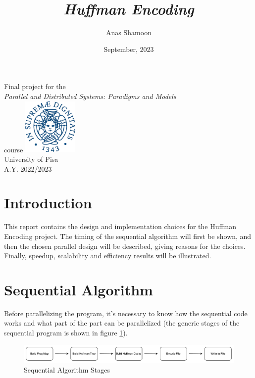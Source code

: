 \documentclass[12pt, letterpaper]{article}  %
\title{\textit{Huffman Encoding}}
\author{Anas Shamoon}
\date{September, 2023}
\begin{document}
\begin{titlepage}
	\maketitle
   \begin{center}
	\vspace{0.5cm}
       Final project for the\\ \textit{Parallel and Distributed Systems: Paradigms and Models}\\ course
       \vfill	     
       \includegraphics[width=0.2\textwidth]{Images/unipi.png}\\
       University of Pisa\\
       A.Y. 2022/2023\\
   \end{center}
\end{titlepage}
\newpage

\setcounter{tocdepth}{7}
\setcounter{secnumdepth}{4}

\maketitle

\begin{center}
\hspace{0.5cm}
{\footnotesize \tableofcontents}
\end{center}


\newpage

\section{Introduction}
This report contains the design and implementation choices for the Huffman Encoding project. The timing of the sequential algorithm will first be shown, and then the chosen parallel design will be described, giving reasons for the choices. Finally, speedup, scalability and efficiency results will be illustrated. 
\section{Sequential Algorithm}
Before parallelizing the program, it's necessary to know how the sequential code works and what part of the part can be parallelized (the generic stages of the sequential program is shown in figure \ref{fig:seq_code}).
\begin{figure}[h!]
    \centering
    \includegraphics[width=1 \textwidth]{Images/sequential-stages.png}
    \caption{Sequential Algorithm Stages}
    \label{fig:seq_code}
\end{figure}
\FloatBarrier
\end{document}
